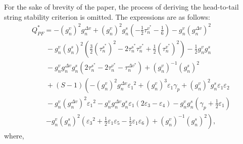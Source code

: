 \documentclass[journal]{IEEEtran}
\begin{document}
For the sake of brevity of the paper, the process of deriving the head-to-tail string stability criterion is omitted. The expressions are as follows:
\begin{equation}
  \begin{array}{l}
    Q_{PF}^* =  - {\left( {g_n^v} \right)^2}g_n^{\Delta v} + {\left( {g_n^v} \right)^2}g_n^s\left( { - \frac{1}{2}\tau _n^{{v^*}} - \frac{1}{6}} \right) - g_n^v{\left( {g_n^{\Delta v}} \right)^2}                                                     \\
    \quad \quad  - g_n^v{\left( {g_n^s} \right)^2}\left( {\frac{3}{2}{{\left( {\tau _n^{{s^*}}} \right)}^2} - 2\tau _n^{{s^*}}\tau _n^{{v^*}} + \frac{1}{2}{{\left( {\tau _n^{{v^*}}} \right)}^2}} \right) - \frac{1}{2}g_n^vg_n^s                      \\
    \quad \quad  - g_n^vg_n^{\Delta v}g_n^s\left( {2\tau _n^{{s^*}} - 2\tau _n^{{v^*}} - \tau _n^{\Delta {v^*}}} \right) + {\left( {g_n^v} \right)^{ - 1}}{\left( {g_n^s} \right)^2}                                                                    \\
    \quad \quad  + \left( {S - 1} \right)\left( { - {{\left( {g_n^v} \right)}^2}g_n^{\Delta v}{\varepsilon _1}^2 + {{\left( {g_n^v} \right)}^3}{\varepsilon _1}{\gamma _p} + {{\left( {g_n^v} \right)}^2}g_n^s{\varepsilon _1}{\varepsilon _2}} \right. \\
    \quad \quad  - g_n^v{\left( {g_n^{\Delta v}} \right)^2}{\varepsilon _1}^2 - g_n^vg_n^{\Delta v}g_n^s{\varepsilon _1}\left( {2{\varepsilon _3} - {\varepsilon _4}} \right) - g_n^vg_n^s\left( {{\gamma _p} + \frac{1}{2}{\varepsilon _1}} \right)    \\
    \quad \quad \left. { - g_n^v{{\left( {g_n^s} \right)}^2}\left( {{\varepsilon _3}^2 + \frac{1}{2}{\varepsilon _1}{\varepsilon _5} - \frac{1}{2}{\varepsilon _1}{\varepsilon _6}} \right) + {{\left( {g_n^v} \right)}^{ - 1}}{{\left( {g_n^s} \right)}^2}} \right),
  \end{array}
\end{equation}
where,
\end{document}
